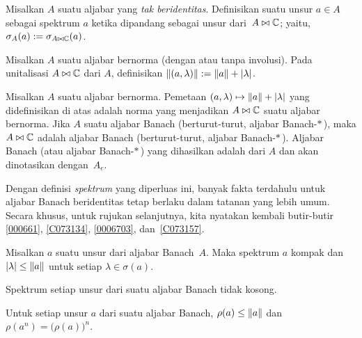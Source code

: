 \begin{defn}\label{00150014} Misalkan $A$ suatu aljabar yang \emph{tak beridentitas}. Definisikan
 suatu unsur $a \in A$ sebagai spektrum $a$ ketika dipandang sebagai unsur
dari~$A \bowtie \mathbb{C}$; yaitu, $\sigma_A(a) := \sigma_{A \bowtie \mathbb{C}}(a)$.
\end{defn}

\begin{defn}\label{00150015} Misalkan $A$ suatu aljabar bernorma (dengan atau tanpa involusi). Pada
unitalisasi $A \bowtie \mathbb{C}$ dari $A$, definisikan $\lVert(a,\lambda)\rVert := \lVert a\rVert + \lvert\lambda\rvert$.
\end{defn}

\begin{prop}\label{001500151} Misalkan $A$ suatu aljabar bernorma. Pemetaan
$(a,\lambda) \mapsto \lVert a\rVert + \lvert\lambda\rvert$ yang didefinisikan di atas adalah norma yang
menjadikan $A \bowtie \mathbb{C}$ suatu aljabar bernorma. Jika $A$ suatu aljabar Banach (berturut-turut,
aljabar Banach-$*\,$), maka $A \bowtie \mathbb{C}$ adalah aljabar Banach (berturut-turut, aljabar
Banach-$*\,$). Aljabar Banach (atau aljabar Banach-$*\,$) yang dihasilkan adalah
 dari $A$ dan akan
dinotasikan dengan~$A_e$.
\end{prop}

Dengan definisi \emph{spektrum} yang diperluas ini, banyak fakta terdahulu untuk aljabar
Banach beridentitas tetap berlaku dalam tatanan yang lebih umum. Secara khusus, untuk
rujukan selanjutnya, kita nyatakan kembali butir-butir \ref{000661}, \ref{C073134},
\ref{0006703}, dan~\ref{C073157}.

\begin{prop}\label{001500157} Misalkan $a$ suatu unsur dari aljabar Banach~$A$. Maka spektrum
$a$ kompak dan $\lvert\lambda\rvert \le \lVert a\rVert$ untuk setiap $\lambda \in \sigma(a)$.
\end{prop}

\begin{prop}\label{00150016} Spektrum setiap unsur dari suatu aljabar Banach tidak kosong.
\end{prop}

\begin{prop}\label{00150017} Untuk setiap unsur $a$ dari suatu aljabar Banach, $\rho(a) \le
\lVert a\rVert$ dan $\rho(a^n) = \bigr(\rho(a)\bigr)^n$.
\end{prop}

